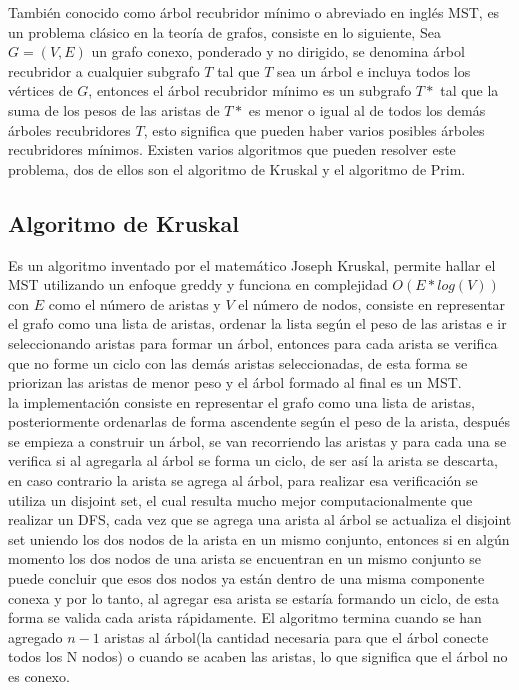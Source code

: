 \documentclass[12pt, a4paper]{article}
\newcommand\cppfile[2][]{

}
\begin{document}
	También conocido como árbol recubridor mínimo o abreviado en inglés MST, es un problema clásico en la teoría de 
	grafos, consiste en lo siguiente, Sea $G = (V, E)$ un grafo conexo, ponderado y no dirigido, se denomina árbol 
	recubridor a cualquier subgrafo $T$ tal que $T$ sea un árbol e incluya todos los vértices de $G$, entonces el 
	árbol recubridor mínimo es un subgrafo $T*$ tal que la suma de los pesos de las aristas de $T*$ es menor o igual 
	al de todos los demás árboles recubridores $T$, esto significa que pueden haber varios posibles árboles 
	recubridores mínimos. Existen varios algoritmos que pueden resolver este problema, dos de ellos son el algoritmo 
	de Kruskal y el algoritmo de Prim.
	
	\subsection{Algoritmo de Kruskal}
	
	Es un algoritmo inventado por el matemático Joseph Kruskal, permite hallar el MST utilizando un enfoque greddy y 
	funciona en complejidad $O(E*log(V))$ con $E$ como el número de aristas y $V$ el número de nodos, consiste en 
	representar el grafo como una lista de aristas, ordenar la lista según el peso de las aristas e ir seleccionando 
	aristas para formar un árbol, entonces para cada arista se verifica que no forme un ciclo con las demás aristas 
	seleccionadas, de esta forma se priorizan las aristas de menor peso y el árbol formado al final es un MST.\\
	
	la implementación consiste en representar el grafo como una lista de aristas, posteriormente ordenarlas de forma 
	ascendente según el peso de la arista, después se empieza a construir un árbol, se van recorriendo las aristas y 
	para cada una se verifica si al agregarla al árbol se forma un ciclo, de ser así la arista se descarta, en caso 
	contrario la arista se agrega al árbol, para realizar esa verificación se utiliza un disjoint set, el cual resulta 
	mucho mejor computacionalmente que realizar un DFS, cada vez que se agrega una arista al árbol se actualiza el 
	disjoint set uniendo los dos nodos de la arista en un mismo conjunto, entonces si en algún momento los dos nodos de
	una arista se encuentran en un mismo conjunto se puede concluir que esos dos nodos ya están dentro de una misma 
	componente conexa y por lo tanto, al agregar esa arista se estaría formando un ciclo, de esta forma se valida cada 
	arista rápidamente. El algoritmo termina cuando se han agregado $n-1$ aristas al árbol(la cantidad necesaria para 
	que el árbol conecte todos los N nodos) o cuando se acaben las aristas, lo que significa que el árbol no es conexo.
	\cppfile[24-43]{Grafos/codigos/kruskal.cpp}
	
	
	

	
\end{document}
